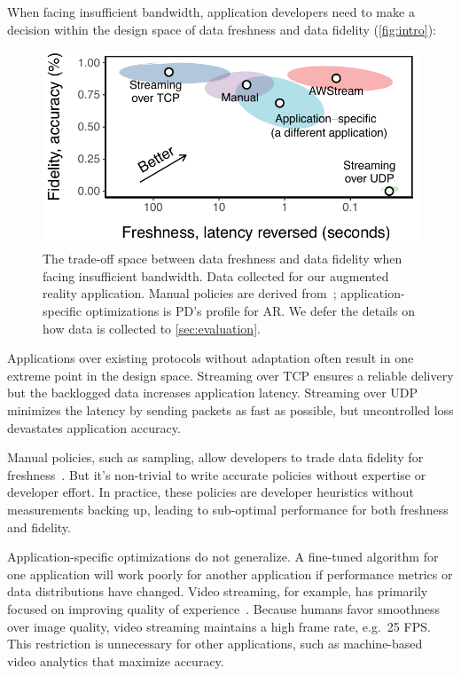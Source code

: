 When facing insufficient bandwidth, application developers need to make a
decision within the design space of data freshness and data fidelity
(\autoref{fig:intro}):

\begin{figure}
  \centering
  \includegraphics[width=0.9\columnwidth]{figures/figure1a.pdf}
  \caption{The trade-off space between data freshness and data fidelity when
    facing insufficient bandwidth. Data collected for our augmented reality
    application. 
    Manual policies are derived from~\cite{rabkin2014aggregation};
    application-specific optimizations is PD's profile for AR. We defer the
    details on how data is collected to \autoref{sec:evaluation}.}
  \label{fig:intro}
  \vspace{-1em}
\end{figure}

Applications over existing protocols without adaptation often result in one
extreme point in the design space. Streaming over TCP ensures a reliable
delivery but the backlogged data increases application latency. Streaming over
UDP minimizes the latency by sending packets as fast as possible, but
uncontrolled loss devastates application accuracy.

Manual policies, such as sampling, allow developers to trade data fidelity for
freshness~\cite{rabkin2014aggregation}. But it's non-trivial to write accurate
policies without expertise or developer effort. In practice, these policies are
developer heuristics without measurements backing up, leading to sub-optimal
performance for both freshness and fidelity.

Application-specific optimizations do not generalize. A fine-tuned algorithm for
one application will work poorly for another application if performance metrics
or data distributions have changed. Video streaming, for example, has primarily
focused on improving quality of experience~\cite{yin2015control}. Because humans
favor smoothness over image quality, video streaming maintains a high frame
rate, e.g.~25 FPS. This restriction is unnecessary for other applications, such
as machine-based video analytics that maximize accuracy.

